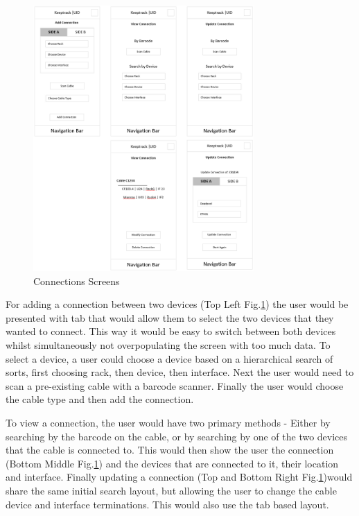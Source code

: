 \documentclass [11pt,a4paper]{article}
\begin{document}
\begin{figure}[H]
    \centering
    \includegraphics[width=0.75\textwidth]{images/initial_prototype_connections.png}
    \caption{Connections Screens}
    \label{fig:low_fidelity_prototypes_connections}
\end{figure}

For adding a connection between two devices (Top Left Fig.\ref{fig:low_fidelity_prototypes_connections}) the user would be presented with tab that would allow them to select the two devices that they wanted to connect. This way it would be easy to switch between both devices whilst simultaneously not overpopulating the screen with too much data. To select a device, a user could choose a device based on a hierarchical search of sorts, first choosing rack, then device, then interface. Next the user would need to scan a pre-existing cable with a barcode scanner. Finally the user would choose the cable type and then add the connection. 

To view a connection, the user would have two primary methods - Either by searching by the barcode on the cable, or by searching by one of the two devices that the cable is connected to. This would then show the user the connection (Bottom Middle Fig.\ref{fig:low_fidelity_prototypes_connections}) and the devices that are connected to it, their location and interface. Finally updating a connection (Top and Bottom Right Fig.\ref{fig:low_fidelity_prototypes_connections})would share the same initial search layout, but allowing the user to change the cable device and interface terminations. This would also use the tab based layout. 
\end{document}
